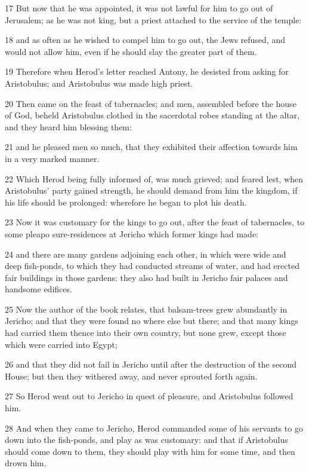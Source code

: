 17 But now that he was appointed, it was not lawful for him to go out of Jerusalem; as he was not king, but a priest attached to the service of the temple: 

18 and as often as he wished to compel him to go out, the Jews refused, and would not allow him, even if he should slay the greater part of them. 

19 Therefore when Herod’s letter reached Antony, he desisted from asking for Aristobulus; and Aristobulus was made high priest. 

20 Then came on the feast of tabernacles; and men, assembled before the house of God, beheld Aristobulus clothed in the sacerdotal robes standing at the altar, and they heard him blessing them: 

21 and he pleased men so much, that they exhibited their affection towards him in a very marked manner. 

22 Which Herod being fully informed of, was much grieved; and feared lest, when Aristobulus’ party gained strength, he should demand from him the kingdom, if his life should be prolonged: wherefore he began to plot his death. 

23 Now it was customary for the kings to go out, after the feast of tabernacles, to some pleapo sure-residences at Jericho which former kings had made: 

24 and there are many gardens adjoining each other, in which were wide and deep fish-ponds, to which they had conducted streams of water, and had erected fair buildings in those gardens: they also had built in Jericho fair palaces and handsome edifices.

25 Now the author of the book relates, that balsam-trees grew abundantly in Jericho; and that they were found no where else but there; and that many kings had carried them thence into their own country, but none grew, except those which were carried into Egypt; 

26 and that they did not fail in Jericho until after the destruction of the second House; but then they withered away, and never sprouted forth again. 

27 So Herod went out to Jericho in quest of pleasure, and Aristobulus followed him. 

28 And when they came to Jericho, Herod commanded some of his servants to go down into the fish-ponds, and play as was customary: and that if Aristobulus should come down to them, they should play with him for some time, and then drown him. 

